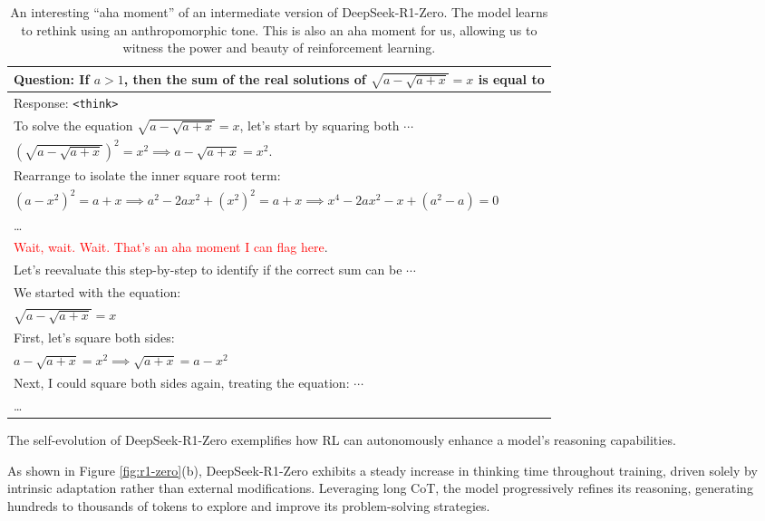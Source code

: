 \documentclass[11pt, a4paper, logo, copyright, nonumbering]{deepseek}
\begin{document}
\begin{CJK*}{UTF8}{gbsn}
\begin{table}[t]
\caption{An interesting ``aha moment'' of an intermediate version of DeepSeek-R1-Zero. The model learns to rethink using an anthropomorphic tone. This is also an aha moment for us, allowing us to witness the power and beauty of reinforcement learning.}\centering
\begin{tabular}{l}
\toprule 
Question: If \(a > 1\), then the sum of the real solutions of \(\sqrt{a - \sqrt{a + x}} = x\) is equal to \\
\midrule
Response: \texttt{<think>} \\
To solve the equation \(\sqrt{a - \sqrt{a + x}} = x\), let's start by squaring both $\cdots$ \\
$\left(\sqrt{a - \sqrt{a + x}}\right)^2 = x^2 \implies a - \sqrt{a + x} = x^2.$ \\
Rearrange to isolate the inner square root term: \\
$(a - x^2)^2 = a + x \implies a^2 - 2ax^2 + (x^2)^2 = a + x \implies x^4 - 2ax^2 - x + (a^2 - a) = 0$ \\
\ldots \\
\textcolor{red}{Wait, wait. Wait. That's an aha moment I can flag here}. \\
Let's reevaluate this step-by-step to identify if the correct sum can be $\cdots$ \\
We started with the equation: \\
$\sqrt{a - \sqrt{a + x}} = x$ \\
First, let's square both sides: \\
$a - \sqrt{a + x} = x^2 \implies \sqrt{a + x} = a - x^2$ \\
Next, I could square both sides again, treating the equation: 
$\cdots$
\\
\ldots \\
\hline
\end{tabular}

\label{tab:aha_moment}
\end{table}

The self-evolution of DeepSeek-R1-Zero exemplifies how RL can autonomously enhance a model’s reasoning capabilities. 
 
As shown in Figure \ref{fig:r1-zero}(b), DeepSeek-R1-Zero exhibits a steady increase in thinking time throughout training, driven solely by intrinsic adaptation rather than external modifications. Leveraging long CoT, the model progressively refines its reasoning, generating hundreds to thousands of tokens to explore and improve its problem-solving strategies.  


\end{CJK*}
\end{document}
